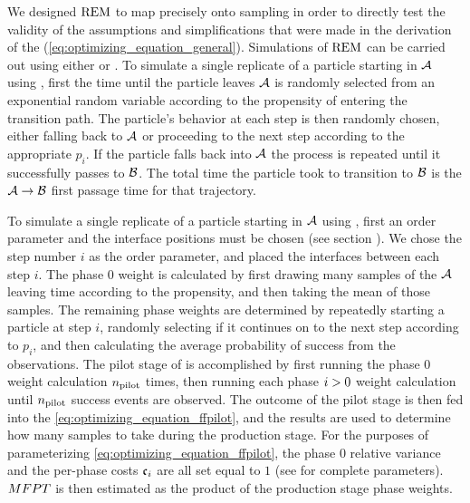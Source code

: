 We designed $\text{REM}$ to map precisely onto  sampling in order to directly test the validity of the assumptions and simplifications that were made in the derivation of the \opteq{} (\eqref{eq:optimizing_equation_general}). Simulations of $\text{REM}$ can be carried out using either  or . To simulate a single replicate of a particle starting in $\mathcal{A}$ using , first the time until the particle leaves $\mathcal{A}$ is randomly selected from an exponential random variable according to the propensity of entering the transition path. The particle's behavior at each step is then randomly chosen, either falling back to $\mathcal{A}$ or proceeding to the next step according to the appropriate $p_i$. If the particle falls back into $\mathcal{A}$ the process is repeated until it successfully passes to $\mathcal{B}$. The total time the particle took to transition to $\mathcal{B}$ is the $\mathcal{A} \rightarrow \mathcal{B}$ first passage time for that trajectory.

To simulate a single replicate of a particle starting in $\mathcal{A}$ using , first an order parameter and the interface positions must be chosen (see section ). We chose the step number $i$ as the order parameter, and placed the interfaces between each step $i$. The phase 0 weight is calculated by first drawing many samples of the $\mathcal{A}$ leaving time according to the propensity, and then taking the mean of those samples. The remaining phase weights are determined by repeatedly starting a particle at step $i$, randomly selecting if it continues on to the next step according to $p_i$, and then calculating the average probability of success from the observations. The pilot stage of  is accomplished by first running the phase 0 weight calculation $n_{\textrm{pilot}}$ times, then running each phase $i>0$ weight calculation until $n_{\textrm{pilot}}$ success events are observed. The outcome of the pilot stage is then fed into the \opteq{} \eqref{eq:optimizing_equation_ffpilot}, and the results are used to determine how many samples to take during the  production stage. For the purposes of parameterizing \eqref{eq:optimizing_equation_ffpilot}, the phase 0 relative variance and the per-phase costs $\mathfrak{c}_{i}$ are all set equal to $1$ (see  for complete parameters). $MFPT$ is then estimated as the product of the production stage phase weights.

